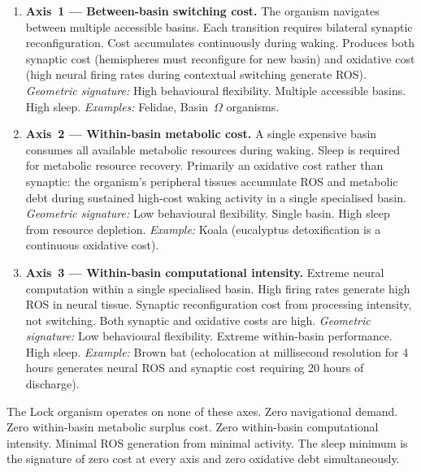 \documentclass[10pt, a4paper]{article}
\begin{document}
\begin{enumerate}[itemsep=0.5em]

  \item \textbf{Axis~1 --- Between-basin
    switching cost.}
    The organism navigates between multiple
    accessible basins. Each transition
    requires bilateral synaptic
    reconfiguration. Cost accumulates
    continuously during waking. Produces
    both synaptic cost (hemispheres must
    reconfigure for new basin) and
    oxidative cost (high neural firing
    rates during contextual switching
    generate ROS).
    \textit{Geometric signature:} High
    behavioural flexibility. Multiple
    accessible basins. High sleep.
    \textit{Examples:} Felidae,
    Basin~$\Omega$ organisms.

  \item \textbf{Axis~2 --- Within-basin
    metabolic cost.}
    A single expensive basin consumes all
    available metabolic resources during
    waking. Sleep is required for
    metabolic resource recovery. Primarily
    an oxidative cost rather than synaptic:
    the organism's peripheral tissues
    accumulate ROS and metabolic debt
    during sustained high-cost waking
    activity in a single specialised basin.
    \textit{Geometric signature:} Low
    behavioural flexibility. Single basin.
    High sleep from resource depletion.
    \textit{Example:} Koala (eucalyptus
    detoxification is a continuous
    oxidative cost).

  \item \textbf{Axis~3 --- Within-basin
    computational intensity.}
    Extreme neural computation within a
    single specialised basin. High firing
    rates generate high ROS in neural
    tissue. Synaptic reconfiguration cost
    from processing intensity, not
    switching. Both synaptic and oxidative
    costs are high.
    \textit{Geometric signature:} Low
    behavioural flexibility. Extreme
    within-basin performance. High sleep.
    \textit{Example:} Brown bat
    (echolocation at millisecond
    resolution for 4 hours generates
    neural ROS and synaptic cost requiring
    20 hours of discharge).

\end{enumerate}

The Lock organism operates on none of
these axes. Zero navigational demand.
Zero within-basin metabolic surplus cost.
Zero within-basin computational intensity.
Minimal ROS generation from minimal
activity. The sleep minimum is the
signature of zero cost at every axis
and zero oxidative debt simultaneously.
\end{document}
